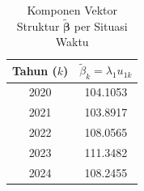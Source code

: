 \begin{table}[H]
\centering
\small
\caption{Komponen Vektor Struktur $\tilde{\boldsymbol{\beta}}$ per Situasi Waktu} \label{tab:app2beta_vec}
\begin{tabular}{|c|c|}
\hline
\textbf{Tahun ($k$)} & \textbf{$\tilde{\beta}_k = \lambda_1 u_{1k}$} \\
\hline
2020 & 104.1053 \\
2021 & 103.8917 \\
2022 & 108.0565 \\
2023 & 111.3482 \\
2024 & 108.2455 \\
\hline
\end{tabular}
\end{table}